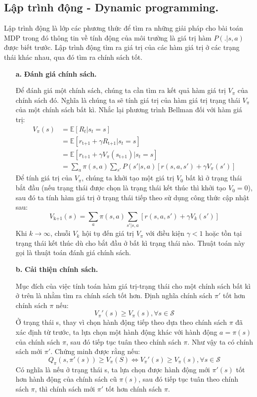 \documentclass{uetgraduation}
\begin{document}
\subsection{Lập trình động - Dynamic programming.}
Lập trình động là lớp các phương thức để tìm ra những giải pháp cho bài toán MDP trong đó thông tin về tính động của môi trường là giá trị hàm $P(.|s, a)$ được biết trước. Lập trình động tìm ra
giá trị của các hàm giá trị ở các trạng thái khác nhau, qua đó tìm ra chính sách tốt.

\begin{itemize}
    \item[\textbf{a.}] \textbf{Đánh giá chính sách.}
    
    Để đánh giá một chính sách, chúng ta cần tìm ra kết quả hàm giá trị $V_\pi$ của chính sách đó. Nghĩa là chúng ta sẽ tính giá trị của hàm giá trị trạng thái $V_\pi$ của một chính sách bất kì.
    Nhắc lại phương trình Bellman đối với hàm giá trị:
    \begin{align*}
        V_\pi (s) &= \mathbb{E} [R_t | s_t = s] \\
        &= \mathbb{E} [r_\text{t+1} + \gamma R_\text{t+1} | s_t = s] \\
        &= \mathbb{E} [r_\text{t+1} + \gamma V_\pi (s_\text{t+1}) | s_t = s] \\
        &= \sum_{a} \pi(s, a) \sum_{s'} P(s' | s, a) [r(s, a, s') + \gamma V_\pi (s')]
    \end{align*}
    Để tính giá trị của $V_\pi$, chúng ta khởi tạo một giá trị $V_0$ bất kì ở trạng thái bắt đầu (nếu trạng thái được chọn là trạng thái kết thúc thì khởi tạo $V_0 = 0$), sau đó ta tính hàm giá trị
    ở trạng thái tiếp theo sử dụng công thức cập nhật sau:
    \[
    V_\text{k+1} (s) = \sum_{a} \pi (s, a) \sum_{s' | s, a} [r(s, a, s') + \gamma V_k (s')]
    \]
    Khi $k \to \infty$, chuỗi $V_k$ hội tụ đến giá trị $V_\pi$ với điều kiện $\gamma < 1$ hoặc tồn tại trạng thái kết thúc dù cho bắt đầu ở bất kì trạng thái nào. Thuật toán này gọi là thuật toán đánh giá
    chính sách.

    \item[\textbf{b.}] \textbf{Cải thiện chính sách.}
    
    Mục đích của việc tính toán hàm giá trị-trạng thái cho một chính sách bất kì ở trên là nhằm tìm ra chính sách tốt hơn. Định nghĩa chính sách $\pi'$ tốt hơn chính sách $\pi$ nếu:
    \[
    V_\pi' (s) \geq V_\pi (s), \forall s \in \mathcal{S}
    \]
    Ở trạng thái s, thay vì chọn hành động tiếp theo dựa theo chính sách $\pi$ đã xác định từ trước, ta lựa chọn một hành động khác với hành động $a = \pi(s)$ của chính sách $\pi$, sau
    đó tiếp tục tuân theo chính sách $\pi$. Như vậy ta có chính sách mới $\pi'$. Chứng minh được rằng nếu:
    \[
    Q_\pi(s, \pi'(s)) \geq V_\pi (S) \iff V_\pi' (s) \geq V_\pi (s), \forall s \in \mathcal{S}
    \]
    Có nghĩa là nếu ở trạng thái s, ta lựa chọn được hành động mới $\pi'(s)$ tốt hơn hành động của chính sách cũ $\pi(s)$, sau đó tiếp tục tuân theo chính sách $\pi$, thì chính sách mới
    $\pi'$ tốt hơn chính sách $\pi$.


\end{itemize}
\end{document}
